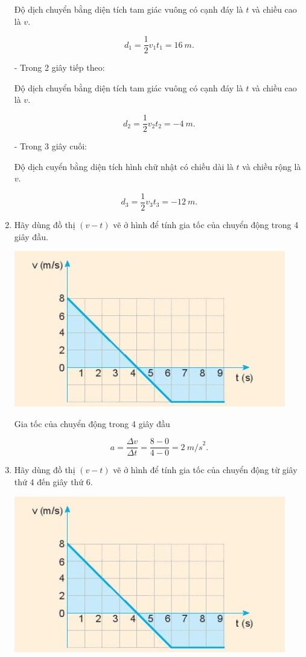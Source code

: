 \begin{enumerate}[label=\bfseries Câu \arabic*:]
{		Độ dịch chuyển bằng diện tích tam giác vuông có cạnh đáy là $t$ và chiều cao là $v$.
		
		$$d_1 = \dfrac{1}{2}v_1t_1 = \SI{16}{m}.$$
		
		- Trong 2 giây tiếp theo:
		
		Độ dịch chuyển bằng diện tích tam giác vuông có cạnh đáy là $t$ và chiều cao là $v$.
		
		$$d_2 = \dfrac{1}{2}v_2t_2 = -\SI{4}{m}.$$
		
		- Trong 3 giây cuối:
		
		Độ dịch cuyển bằng diện tích hình chữ nhật có chiều dài là $t$ và chiều rộng là $v$.
		
		$$d_3 = \dfrac{1}{2}v_3t_3 = -\SI{12}{m}.$$
		
		
	}
	\item {}

	
	{
		Hãy dùng đồ thị $(v-t)$ vẽ ở hình để tính gia tốc của chuyển động trong 4 giây đầu.
		\begin{center}
			\includegraphics[scale=1]{../figs/VN10-2022-PH-TP012-4.jpg}
		\end{center}
	}

	\hideall
	{	
		Gia tốc của chuyển động trong 4 giây đầu
		
		$$a = \dfrac{\Delta v}{\Delta t} =\dfrac{8 - 0}{4-0}= \SI{2}{m/s}^2.$$
	}
	\item {}

	
	{Hãy dùng đồ thị $(v-t)$ vẽ ở hình để tính gia tốc của chuyển động từ giây thứ 4 đến giây thứ 6.
		\begin{center}
			\includegraphics[scale=1]{../figs/VN10-2022-PH-TP012-4.jpg}
		\end{center}
	}


\end{enumerate}
